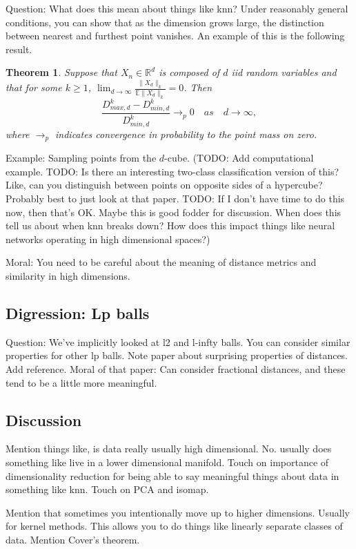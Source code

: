 \documentclass{book}
\newtheorem{theorem}{Theorem}
\newcommand{\R}{\mathbb{R}}
\newcommand{\E}{\mathbb{E}}
\begin{document}
Question: What does this mean about things like knn? Under reasonably general conditions, you can show that as the dimension grows large, the distinction between nearest and furthest point vanishes. An example of this is the following result. 
\begin{theorem}
Suppose that $X_n\in \R^d$ is composed of $d$ iid random variables and that for some $k\geq 1$, $\lim_{d\to\infty} \frac{\|X_d\|_k}{\E \|X_d\|_k} = 0$. Then 
$$
\frac{D_{max, d}^k - D_{min, d}^k}{D_{min, d}^k} \to_{p} 0 \quad as \quad d\to \infty,
$$
where $\to_p$ indicates convergence in probability to the point mass on zero. 
\end{theorem}

Example: Sampling points from the $d$-cube. (TODO: Add computational example. TODO: Is there an interesting two-class classification version of this? Like, can you distinguish between points on opposite sides of a hypercube? Probably best to just look at that paper. TODO: If I don't have time to do this now, then that's OK. Maybe this is good fodder for discussion. When does this tell us about when knn breaks down? How does this impact things like neural networks operating in high dimensional spaces?)  

Moral: You need to be careful about the meaning of distance metrics and similarity in high dimensions. 

\subsection{Digression: Lp balls}
Question: We've implicitly looked at l2 and l-infty balls. You can consider similar properties for other lp balls. Note paper about surprising properties of distances. Add reference. Moral of that paper: Can consider fractional distances, and these tend to be a little more meaningful. 

\subsection{Discussion}
Mention things like, is data really usually high dimensional. No. usually does something like live in a lower dimensional manifold. Touch on importance of dimensionality reduction for being able to say meaningful things about data in something like knn. Touch on PCA and isomap. 

Mention that sometimes you intentionally move up to higher dimensions. Usually for kernel methods. This allows you to do things like linearly separate classes of data. Mention Cover's theorem. 
\end{document}
